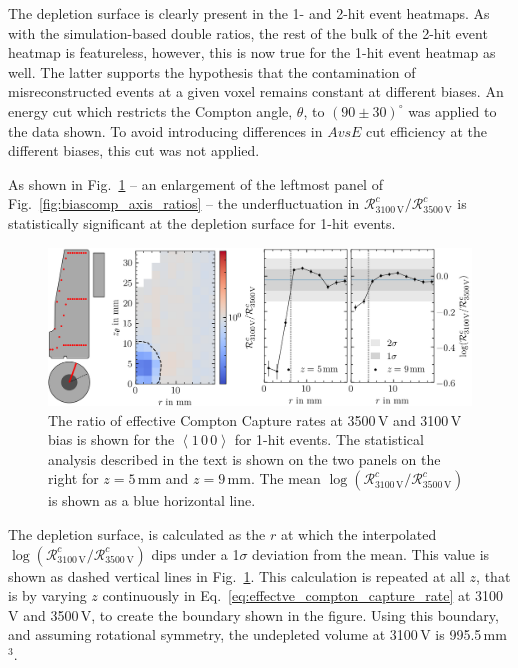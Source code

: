 The depletion surface is clearly present in the 1- and 2-hit event heatmaps. As with the simulation-based double ratios, the rest of the bulk of the 2-hit event heatmap is featureless, however, this is now true for the 1-hit event heatmap as well. The latter supports the hypothesis that the contamination of misreconstructed events at a given voxel remains constant at different biases. An energy cut which restricts the Compton angle, $\theta$, to $(90\pm30)^\circ$ was applied to the data shown. To avoid introducing differences in $AvsE$ cut efficiency at the different biases, this cut was not applied. 

As shown in Fig.~\ref{fig:bubble_3100} -- an enlargement of the leftmost panel of Fig.~\ref{fig:biascomp_axis_ratios} -- the underfluctuation in $\mathcal{R}^c_{3100\,\text{V}}/\mathcal{R}^c_{3500\,\text{V}}$ is statistically significant at the depletion surface for 1-hit events.
\begin{figure}[htb]
    \centering
    \includegraphics[width=6in]{figs/trapping/biascomp_bubble.png}
    \caption{The ratio of effective Compton Capture rates at 3500\,V and 3100\,V bias is shown for the $\left<1\,0\,0\right>$ for 1-hit events. The statistical analysis described in the text is shown on the two panels on the right for $z=5$\,mm and $z=9$\,mm. The mean $\log(\mathcal{R}^c_{3100\,\text{V}}/\mathcal{R}^c_{3500\,\text{V}})$ is shown as a blue horizontal line.}
	\label{fig:bubble_3100}
\end{figure}
The depletion surface, is calculated as the $r$ at which the interpolated $\log(\mathcal{R}^c_{3100\,\text{V}}/\mathcal{R}^c_{3500\,\text{V}})$ dips under a 1$\sigma$ deviation from the mean. This value is shown as dashed vertical lines in Fig.~\ref{fig:bubble_3100}. This calculation is repeated at all $z$, that is by varying $z$ continuously in Eq.~\ref{eq:effectve_compton_capture_rate} at 3100\,V and 3500\,V, to create the boundary shown in the figure. Using this boundary, and assuming rotational symmetry, the undepleted volume at 3100\,V is 995.5\,mm$^3$. 
